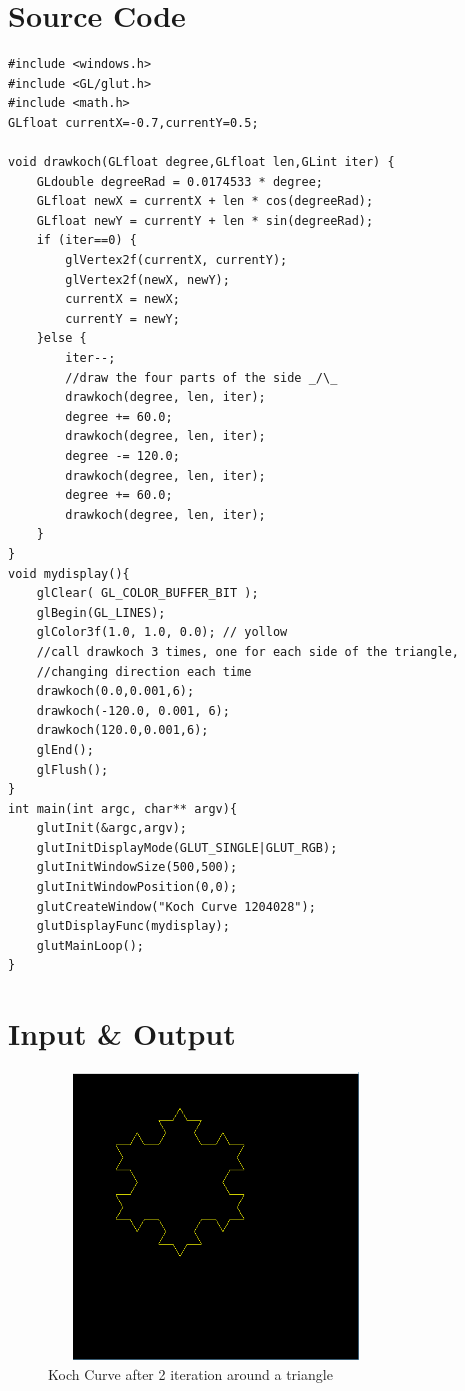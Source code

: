 \documentclass[11pt]{report}
\begin{document}
\section{Source Code}
\begin{lstlisting}
#include <windows.h>
#include <GL/glut.h>
#include <math.h>
GLfloat currentX=-0.7,currentY=0.5;

void drawkoch(GLfloat degree,GLfloat len,GLint iter) {
	GLdouble degreeRad = 0.0174533 * degree;
	GLfloat newX = currentX + len * cos(degreeRad);
	GLfloat newY = currentY + len * sin(degreeRad);
	if (iter==0) {
		glVertex2f(currentX, currentY);
		glVertex2f(newX, newY);
		currentX = newX;
		currentY = newY;
	}else {
		iter--;
		//draw the four parts of the side _/\_
		drawkoch(degree, len, iter);
		degree += 60.0;
		drawkoch(degree, len, iter);
		degree -= 120.0;
		drawkoch(degree, len, iter);
		degree += 60.0;
		drawkoch(degree, len, iter);
	}
}
void mydisplay(){
	glClear( GL_COLOR_BUFFER_BIT );
	glBegin(GL_LINES);
	glColor3f(1.0, 1.0, 0.0); // yollow
	//call drawkoch 3 times, one for each side of the triangle, 
	//changing direction each time
	drawkoch(0.0,0.001,6);
	drawkoch(-120.0, 0.001, 6);
	drawkoch(120.0,0.001,6);
	glEnd();
	glFlush();
}
int main(int argc, char** argv){
	glutInit(&argc,argv);
	glutInitDisplayMode(GLUT_SINGLE|GLUT_RGB);
	glutInitWindowSize(500,500);
	glutInitWindowPosition(0,0);
	glutCreateWindow("Koch Curve 1204028");
	glutDisplayFunc(mydisplay);
	glutMainLoop();
}

\end{lstlisting}
\clearpage
\section{Input \& Output}
\begin{figure}[ht!]
	\centering
	\includegraphics[height=3.0in,width=3.5in]{koch_2}
	\caption{Koch Curve after 2 iteration around a triangle}
\end{figure}
\end{document}
